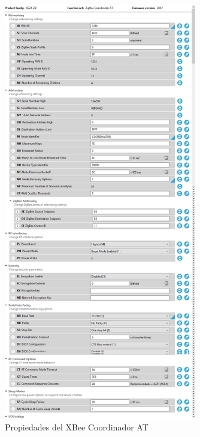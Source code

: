 \begin{figure}[H]
\centering
\includegraphics[width=0.75\textwidth]{figuras/XCTUPropCoord.png}
\caption{Propiedades del XBee Coordinador AT}
\label{fig:XCTUPropCoord}
\end{figure}

